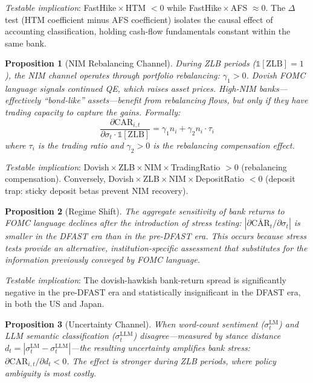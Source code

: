 \documentclass[12pt,a4paper]{article}
\newtheorem{proposition}{Proposition}
\begin{document}
\noindent\textit{Testable implication}: FastHike\,$\times$\,HTM $< 0$ while FastHike\,$\times$\,AFS $\approx 0$. The $\Delta$ test (HTM coefficient minus AFS coefficient) isolates the causal effect of accounting classification, holding cash-flow fundamentals constant within the same bank.

\begin{proposition}[NIM Rebalancing Channel]\label{prop:nim}
During ZLB periods ($\mathbb{1}[\text{ZLB}] = 1$), the NIM channel operates through portfolio rebalancing: $\gamma_1 > 0$. Dovish FOMC language signals continued QE, which raises asset prices. High-NIM banks---effectively ``bond-like'' assets---benefit from rebalancing flows, but only if they have trading capacity to capture the gains. Formally:
\begin{equation}\label{eq:rebalancing}
\frac{\partial \text{CAR}_{i,t}}{\partial \sigma_t \cdot \mathbb{1}[\text{ZLB}]} = \gamma_1 n_i + \gamma_2 n_i \cdot \tau_i
\end{equation}
where $\tau_i$ is the trading ratio and $\gamma_2 > 0$ is the rebalancing compensation effect.
\end{proposition}

\noindent\textit{Testable implication}: Dovish\,$\times$\,ZLB\,$\times$\,NIM\,$\times$\,TradingRatio $> 0$ (rebalancing compensation). Conversely, Dovish\,$\times$\,ZLB\,$\times$\,NIM\,$\times$\,DepositRatio $< 0$ (deposit trap: sticky deposit betas prevent NIM recovery).

\begin{proposition}[Regime Shift]\label{prop:regime}
The aggregate sensitivity of bank returns to FOMC language declines after the introduction of stress testing: $|\partial \bar{\text{CAR}}_t / \partial \sigma_t|$ is smaller in the DFAST era than in the pre-DFAST era. This occurs because stress tests provide an alternative, institution-specific assessment that substitutes for the information previously conveyed by FOMC language.
\end{proposition}

\noindent\textit{Testable implication}: The dovish-hawkish bank-return spread is significantly negative in the pre-DFAST era and statistically insignificant in the DFAST era, in both the US and Japan.

\begin{proposition}[Uncertainty Channel]\label{prop:uncertainty}
When word-count sentiment ($\sigma_t^{\text{LM}}$) and LLM semantic classification ($\sigma_t^{\text{LLM}}$) disagree---measured by stance distance $d_t = |\sigma_t^{\text{LM}} - \sigma_t^{\text{LLM}}|$---the resulting uncertainty amplifies bank stress: $\partial \text{CAR}_{i,t} / \partial d_t < 0$. The effect is stronger during ZLB periods, where policy ambiguity is most costly.
\end{proposition}
\end{document}
